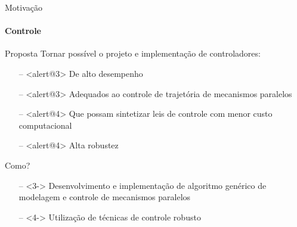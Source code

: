 \documentclass[25pt,landscape]{beamer}
\begin{document}
\begin{frame}{Motiva\c{c}\~ao}
    \framesubtitle{Controle}
    \begin{block}{Proposta}
        Tornar poss\'ivel o projeto e implementa\c{c}\~ao de controladores:
        \begin{itemize}
            \item[--]<alert@3> De alto desempenho
            \item[--]<alert@3> Adequados ao controle de trajet\'oria de mecanismos paralelos
            \item[--]<alert@4> Que possam sintetizar leis de controle com menor custo computacional
            \item[--]<alert@4> Alta robustez
        \end{itemize}
    \end{block}
    \pause
    \begin{exampleblock}{Como?}
        \begin{itemize}
            \item[--]<3-> Desenvolvimento e implementa\c{c}\~ao de algoritmo gen\'erico de modelagem e controle de mecanismos paralelos
            \item[--]<4-> Utiliza\c{c}\~ao de t\'ecnicas de controle robusto
        \end{itemize}
    \end{exampleblock}
\end{frame}
\end{document}
